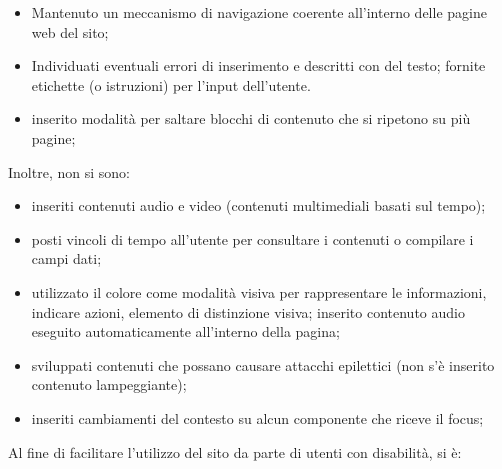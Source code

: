 {{\begin{itemize}
\begin{itemize}
\begin{itemize}
					\item aggiunta di una label ad ogni campo di input della form, in aiuto dello screen reader; corredata ogni form di una legend, per i medesimi motivi.
				\end{itemize}
			\item intestazioni ed etichette appropriate; 
			\item l'indicatore del focus nelle interfacce utilizzabili da tastiera; 
			\item lingua predefinita per il contenuto delle pagine; usati gli attributi \texttt{xml:lang} per definire parole o blocchi in lingua diversa da quella predefinita della pagina; non sono state utilizzate abbreviazioni od acronimi;
 			\item definiti i tag meta: \textit{Description, Keywords, Copyright, Author}; le parole chiave contenute nel tag "keywords" sono in lingua italiana, visto il pubblico a cui il sito si rivolge.
 			\item È stato definito infine un link di ritorno ad inizio pagina.
		\end{itemize} 
		\item Mantenuto un meccanismo di navigazione coerente all'interno delle pagine web del sito;
		\item Individuati eventuali errori di inserimento e descritti con del testo; fornite etichette (o istruzioni) per l'input dell'utente.
		\item inserito modalità per saltare blocchi di contenuto che si ripetono su più pagine;
	\end{itemize}
	Inoltre, non si sono:
	\begin{itemize}\itemsep1pt
		\item inseriti contenuti audio e video (contenuti multimediali basati sul tempo);
		\item posti vincoli di tempo all'utente per consultare i contenuti o compilare i campi dati;
		\item utilizzato il colore come modalità visiva per rappresentare le informazioni, indicare azioni, elemento di distinzione visiva; inserito contenuto audio eseguito automaticamente all'interno della pagina;
		\item sviluppati contenuti che possano causare attacchi epilettici (non s'è inserito contenuto lampeggiante);
		\item inseriti cambiamenti del contesto su alcun componente che riceve il focus;
	\end{itemize}
		Al fine di facilitare l'utilizzo del sito da parte di utenti con disabilità, si è:
}}

